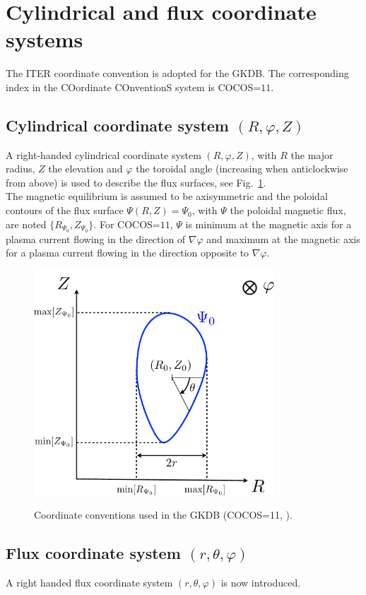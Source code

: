 \documentclass[a4paper]{report}
\begin{document}
\section{Cylindrical and flux coordinate systems}
The ITER coordinate convention is adopted for the GKDB. The corresponding index in the COordinate COnventionS system  \cite{Sauter:CPC2013} is COCOS=$11$.
\subsection{Cylindrical coordinate system $(R,\varphi,Z)$}
A right-handed cylindrical coordinate system $(R,\varphi,Z)$, with $R$ the major radius, $Z$ the elevation and $\varphi$ the toroidal angle (increasing when anticlockwise from above) is used to describe the flux surfaces, see Fig.~\ref{fig:coord1}. \\
The magnetic equilibrium is assumed to be axisymmetric and the poloidal contours of the flux surface $\Psi(R,Z)=\Psi_0$, with $\Psi$ the poloidal magnetic flux, are noted $\{R_{\Psi_0},Z_{\Psi_0}\}$.
For COCOS=$11$, $\Psi$ is minimum at the magnetic axis for a plasma current flowing in the direction of $\nabla \varphi$ and maximum at the magnetic axis for a plasma current flowing in the direction opposite to $\nabla \varphi$.
\begin{figure}[h]
\begin{center}
  \includegraphics[width=9cm]{COCOS.pdf}\\
  \caption{\label{fig:coord1} Coordinate conventions used in the GKDB (COCOS=11, \cite{Sauter:CPC2013}).}
\end{center}
\end{figure}

\subsection{Flux coordinate system $(r,\theta,\varphi)$}
A right handed flux coordinate system $(r,\theta,\varphi)$ is now introduced.
\end{document}
